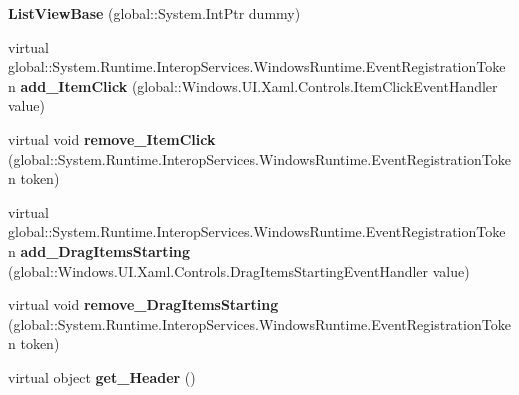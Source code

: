 \begin{DoxyCompactItemize}
\item 
\mbox{\label{class_windows_1_1_u_i_1_1_xaml_1_1_controls_1_1_list_view_base_a03e11b8607c3d8428a5603387ff9370f}} 
{\bfseries List\+View\+Base} (global\+::\+System.\+Int\+Ptr dummy)
\item 
\mbox{\label{class_windows_1_1_u_i_1_1_xaml_1_1_controls_1_1_list_view_base_a91aed6f56d2fcd34719f771369fa7d13}} 
virtual global\+::\+System.\+Runtime.\+Interop\+Services.\+Windows\+Runtime.\+Event\+Registration\+Token {\bfseries add\+\_\+\+Item\+Click} (global\+::\+Windows.\+U\+I.\+Xaml.\+Controls.\+Item\+Click\+Event\+Handler value)
\item 
\mbox{\label{class_windows_1_1_u_i_1_1_xaml_1_1_controls_1_1_list_view_base_acc4288ea67ceb5d3c79dab6a268639f8}} 
virtual void {\bfseries remove\+\_\+\+Item\+Click} (global\+::\+System.\+Runtime.\+Interop\+Services.\+Windows\+Runtime.\+Event\+Registration\+Token token)
\item 
\mbox{\label{class_windows_1_1_u_i_1_1_xaml_1_1_controls_1_1_list_view_base_a85a658cab21ea353f8b12e255c61ffd0}} 
virtual global\+::\+System.\+Runtime.\+Interop\+Services.\+Windows\+Runtime.\+Event\+Registration\+Token {\bfseries add\+\_\+\+Drag\+Items\+Starting} (global\+::\+Windows.\+U\+I.\+Xaml.\+Controls.\+Drag\+Items\+Starting\+Event\+Handler value)
\item 
\mbox{\label{class_windows_1_1_u_i_1_1_xaml_1_1_controls_1_1_list_view_base_ad3ae84be415d5e14b9ab060cec7ced16}} 
virtual void {\bfseries remove\+\_\+\+Drag\+Items\+Starting} (global\+::\+System.\+Runtime.\+Interop\+Services.\+Windows\+Runtime.\+Event\+Registration\+Token token)
\item 
\mbox{\label{class_windows_1_1_u_i_1_1_xaml_1_1_controls_1_1_list_view_base_a23229b9cd6ccf8c31885dc9594c5df62}} 
virtual object {\bfseries get\+\_\+\+Header} ()
\item 
\mbox{\label{class_windows_1_1_u_i_1_1_xaml_1_1_controls_1_1_list_view_base_ac03683b52f206ce90a2d5585d50835c9}} 

\end{DoxyCompactItemize}
